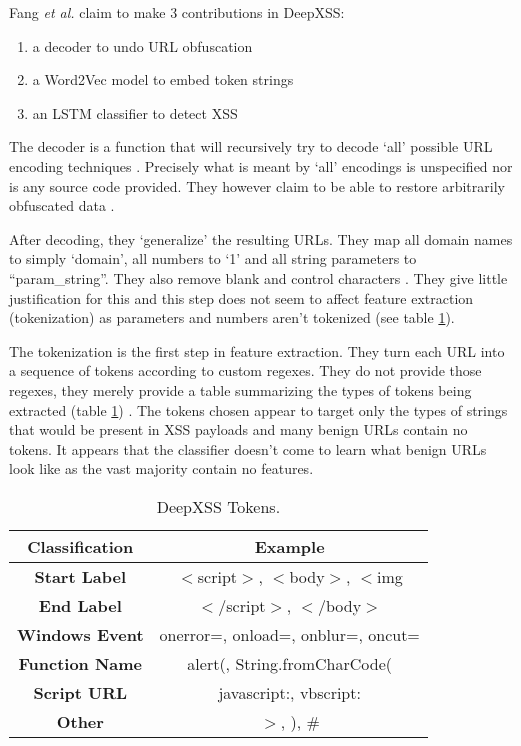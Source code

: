 Fang \textit{et al.} claim to make 3 contributions in DeepXSS:

\begin{enumerate}
\item a decoder to undo URL obfuscation
\item a Word2Vec model to embed token strings
\item an LSTM classifier to detect XSS
\end{enumerate}

The decoder is a function that will recursively try to decode `all' possible URL encoding techniques \cite{fang2018deepxss}. Precisely what is meant by `all' encodings is unspecified nor is any source code provided. They however claim to be able to restore arbitrarily obfuscated data \cite{fang2018deepxss}.

After decoding, they `generalize' the resulting URLs. They map all domain names to simply `domain', all numbers to `1' and all string parameters to ``param\_string''. They also remove blank and control characters \cite{fang2018deepxss}. They give little justification for this and this step does not seem to affect feature extraction (tokenization) as parameters and numbers aren't tokenized (see table \ref{tok:tab}). 

The tokenization is the first step in feature extraction. They turn each URL into a sequence of tokens according to custom regexes. They do not provide those regexes, they merely provide a table summarizing the types of tokens being extracted (table \ref{tok:tab}) \cite{fang2018deepxss}. The tokens chosen appear to target only the types of strings that would be present in XSS payloads and many benign URLs contain no tokens. It appears that the classifier doesn't come to learn what benign URLs look like as the vast majority contain no features. 

\begin{table}
\begin{center}
\begingroup
\setlength{\tabcolsep}{5pt} %
\renewcommand{\arraystretch}{1.5} %
\begin{tabular}{||c | c||} 
    \hline
    Classification & Example \\ [0.5ex] 
    \hline\hline
    \textbf{Start Label} &  $<$script$>$, $<$body$>$, $<$img \\ 
    \hline
    \textbf{End Label} & $</$script$>$, $</$body$>$ \\
    \hline
    \textbf{Windows Event} & onerror=, onload=, onblur=, oncut= \\
    \hline
    \textbf{Function Name} & alert(, String.fromCharCode( \\
    \hline
    \textbf{Script URL} & javascript:, vbscript: \\ 
    \hline
    \textbf{Other} & $>$, ), \# \\ [1ex] 
    \hline
\end{tabular}
\endgroup
\caption{\label{tok:tab}DeepXSS Tokens.}
\end{center}
\end{table}

